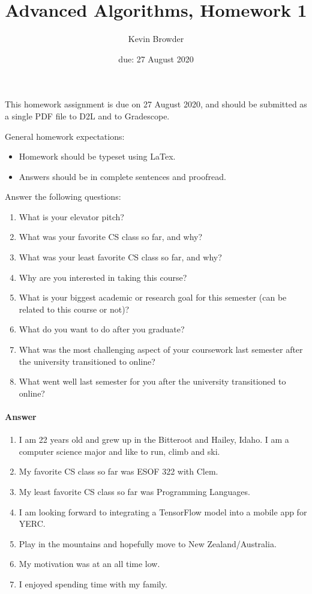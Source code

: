 \documentclass{article}
\title{Advanced Algorithms, Homework 1}
\author{Kevin Browder}
\date{due: 27 August 2020}
\begin{document}
\maketitle

This homework assignment is due on 27 August 2020, and should be
submitted as a single PDF file to D2L and to Gradescope.

General homework expectations:
\begin{itemize}
    \item Homework should be typeset using LaTex.
    \item Answers should be in complete sentences and proofread.
\end{itemize}

\nextprob
{}

Answer the following questions:
\begin{enumerate}
    \item What is your elevator pitch? 
    \item What was your favorite CS class so far, and why? 
    \item What was your least favorite CS class so far, and why? 
    \item Why are you interested in taking this course? 
    \item What is your biggest academic or research goal for this semester (can
        be related to this course or not)? 
    \item What do you want to do after you graduate? 
    \item What was the most challenging aspect of your coursework last semester
        after the university transitioned to online? 
    \item What went well last semester for you after the university transitioned
        to online? 
\end{enumerate}

\paragraph{Answer}


\begin{enumerate}
	\item I am 22 years old and grew up in the Bitteroot and Hailey, Idaho. I am a computer science major and like to run, climb and ski. 
	\item My favorite CS class so far was ESOF 322 with Clem.
	\item My least favorite CS class so far was Programming Languages.
	\item I am looking forward to integrating a TensorFlow model into a mobile app for YERC. 
	\item Play in the mountains and hopefully move to New Zealand/Australia.
	\item My motivation was at an all time low. 
	\item I enjoyed spending time with my family.
\end{enumerate}
\end{document}
